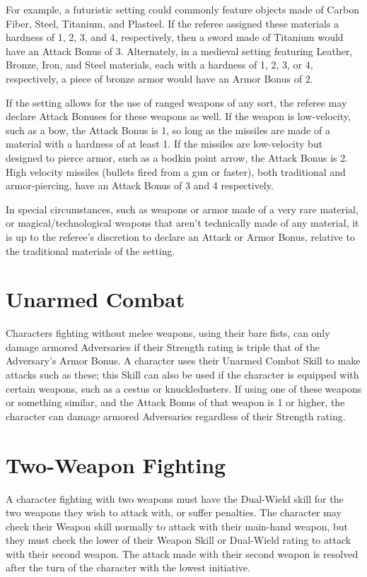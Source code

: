 \documentclass[oneside]{book}
\begin{document}
\begin{multicols}{2}
For example, a futuristic setting could commonly feature objects made of Carbon Fiber, Steel, Titanium, and Plasteel. If the referee assigned these materials a hardness of 1, 2, 3, and 4, respectively, then a sword made of Titanium would have an Attack Bonus of 3. Alternately, in a medieval setting featuring Leather, Bronze, Iron, and Steel materials, each with a hardness of 1, 2, 3, or 4, respectively, a piece of bronze armor would have an Armor Bonus of 2. 

If the setting allows for the use of ranged weapons of any sort, the referee may declare Attack Bonuses for these weapons as well. If the weapon is low-velocity, such as a bow, the Attack Bonus is 1, so long as the missiles are made of a material with a hardness of at least 1. If the missiles are low-velocity but designed to pierce armor, such as a bodkin point arrow, the Attack Bonus is 2. High velocity missiles (bullets fired from a gun or faster), both traditional and armor-piercing, have an Attack Bonus of 3 and 4 respectively. 

In special circumstances, such as weapons or armor made of a very rare material, or magical/technological weapons that aren't technically made of any material, it is up to the referee's discretion to declare an Attack or Armor Bonus, relative to the traditional materials of the setting. 

\section{Unarmed Combat}
Characters fighting without melee weapons, using their bare fists, can only damage armored Adversaries if their Strength rating is triple that of the Adversary's Armor Bonus. A character uses their Unarmed Combat Skill to make attacks such as these; this Skill can also be used if the character is equipped with certain weapons, such as a cestus or knuckledusters. If using one of these weapons or something similar, and the Attack Bonus of that weapon is 1 or higher, the character can damage armored Adversaries regardless of their Strength rating.  

\section{Two-Weapon Fighting}
A character fighting with two weapons must have the Dual-Wield skill for the two weapons they wish to attack with, or suffer penalties. The character may check their Weapon skill normally to attack with their main-hand weapon, but they must check the lower of their Weapon Skill or Dual-Wield rating to attack with their second weapon. The attack made with their second weapon is resolved after the turn of the character with the lowest initiative. 


\end{multicols}
\end{document}
